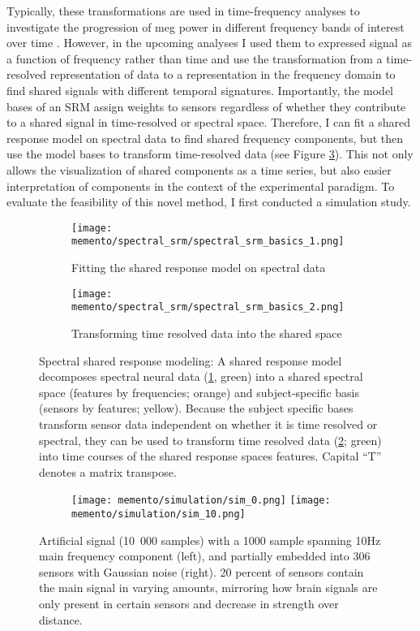 Typically, these transformations are used in time-frequency analyses to investigate the progression of \gls{meg} power in different frequency bands of interest over time \citep{hari2017primer}.
However, in the upcoming analyses I used them to expressed signal as a function of frequency rather than time and use the transformation from a time-resolved representation of data to a representation in the frequency domain to find shared signals with different temporal signatures.
Importantly, the model bases of an \gls{SRM} assign weights to sensors regardless of whether they contribute to a shared signal in time-resolved or spectral space.
Therefore, I can fit a shared response model on spectral data to find shared frequency components, but then use the model bases to transform time-resolved data (see Figure \ref{fig:spectral-srm}).
This not only allows the visualization of shared components as a time series, but also easier interpretation of components in the context of the experimental paradigm.
To evaluate the feasibility of this novel method, I first conducted a simulation study.

\begin{figure}
	\centering
	\begin{subfigure}{0.9\textwidth}
		\texttt{[image: memento/spectral\_srm/spectral\_srm\_basics\_1.png]}
		\caption{Fitting the shared response model on spectral data}
		\label{fig:spectral-srm1}
	\end{subfigure}
	\begin{subfigure}{0.9\textwidth}
		\texttt{[image: memento/spectral\_srm/spectral\_srm\_basics\_2.png]}
		\caption{Transforming time resolved data into the shared space}
		\label{fig:spectral-srm2}
	\end{subfigure}
	\caption[Spectral shared response modeling]{Spectral shared response modeling: A shared response model decomposes spectral neural data (\ref{fig:spectral-srm1}, green) into a shared spectral space (features by frequencies; orange) and subject-specific basis (sensors by features; yellow). Because the subject specific bases transform sensor data independent on whether it is time resolved or spectral, they can be used to transform time resolved data (\ref{fig:spectral-srm2}; green) into time courses of the shared response spaces features. Capital ``T'' denotes a matrix transpose.}
	\label{fig:spectral-srm}
\end{figure}

\begin{figure}[H]
	\begin{subfigure}{.8\textwidth}
		\centering
		\texttt{[image: memento/simulation/sim\_0.png]}
		\texttt{[image: memento/simulation/sim\_10.png]}
	\end{subfigure}
	\caption[Artificial signal for simulation]{Artificial signal (10~000 samples) with a 1000 sample spanning 10Hz main frequency component (left), and partially embedded into 306 sensors with Gaussian noise (right). 20 percent of sensors contain the main signal in varying amounts, mirroring how brain signals are only present in certain sensors and decrease in strength over distance.}
	\label{fig:sim_artificial_signal}
\end{figure}

